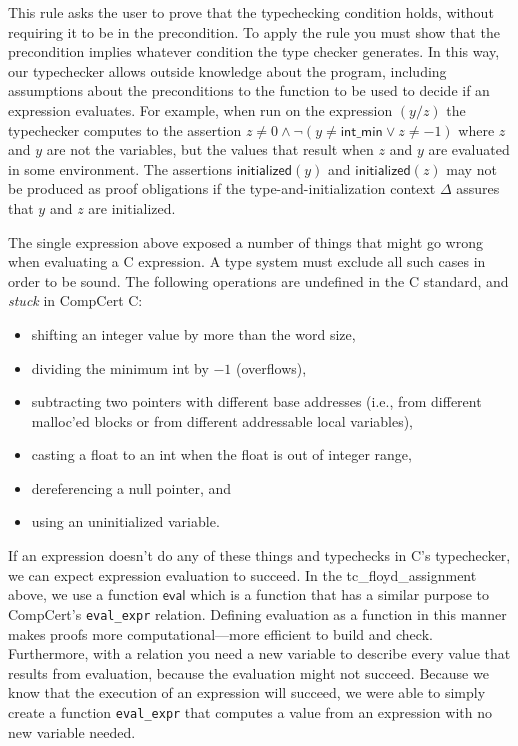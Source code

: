 \documentclass{puthesis}
\begin{document}
This rule asks the user to prove that the typechecking condition
holds, without requiring it to be in the precondition.  To apply the
rule you must show that the precondition implies whatever condition
the type checker generates. In this way, our typechecker allows
outside knowledge about the program, including assumptions about the
preconditions to the function to be used to decide if an expression
evaluates.  For example, when run on the expression $(y/z)$ the
typechecker computes to the assertion $z \not= 0 \wedge \neg (y \not=
\mathsf{int\_min} \vee z \not= -1)$ where $z$ and $y$ are not the
variables, but the values that result when $z$ and $y$ are evaluated
in some environment. The assertions $\mathsf{initialized}(y)$ and
$\mathsf{initialized}(z)$ may not be produced as proof obligations if
the type-and-initialization context $\Delta$ assures that $y$ and $z$
are initialized.

The single expression above exposed a number of things that might go wrong when
evaluating a C expression. A type system must exclude all such cases
in order to be sound. The following operations are undefined in the C
standard, and \emph{stuck} in CompCert C:
\begin {itemize}
  \item shifting an integer value by more than the word size,
  \item dividing the minimum int by $-1$  (overflows),
  \item subtracting two pointers with different base addresses (i.e.,
from different malloc'ed blocks or from different addressable local
variables),
  \item casting a float to an int when the float is out of integer range,
  \item dereferencing a null pointer, and
  \item using an uninitialized variable.
\end{itemize}

If an expression doesn't do any of these things and typechecks in C's
typechecker, we can expect expression evaluation to succeed. In the
tc\_floyd\_assignment above, we use a function $\mathsf{eval}$ which
is a function that has a similar purpose to CompCert's
\lstinline|eval_expr| relation.  Defining evaluation as a function in
this manner makes proofs more computational---more efficient to build
and check. Furthermore, with a relation you need a new variable to
describe every value that results from evaluation, because the
evaluation might not succeed. Because we know that the execution of an
expression will succeed, we were able to simply create a function
\lstinline|eval_expr| that computes a value from an expression with no
new variable needed.
\end{document}
